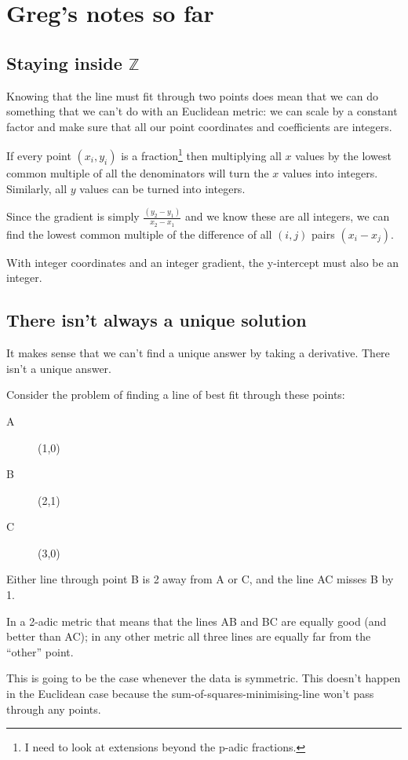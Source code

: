 \documentclass[a4paper,twocolumn, 10pt]{article}
\begin{document}
\section{Greg's notes so far}

\subsection{Staying inside $\mathbb{Z}$}

Knowing that the line must fit through two points does mean that we can do
something that we can't do with an Euclidean metric: we can scale by a constant
factor and make sure that all our point coordinates and coefficients are integers.

If every point $(x_i, y_i)$ is a fraction\footnote{I need to look at extensions beyond
  the p-adic fractions.} then multiplying all $x$ values by the lowest common multiple of all
the denominators will turn the $x$ values into integers. Similarly, all $y$ values can be turned
into integers.

Since the gradient is simply $\frac{(y_2 - y_1)}{x_2 - x_1}$ and we know these are all integers,
we can find the lowest
common multiple of the difference of all $(i,j)$ pairs $(x_i - x_j)$.

With integer coordinates and an integer gradient, the y-intercept must also be an integer.

\subsection{There isn't always a unique solution}

It makes sense that we can't find a unique answer by taking a derivative. There isn't a unique answer.

Consider the problem of finding a line of best fit through these points:

\begin{description}
\item[A] (1,0)
\item[B] (2,1)
\item[C] (3,0)
\end{description}

Either line through point B is 2 away from A or C, and the line AC misses B by 1.

In a 2-adic metric that means that the lines AB and BC are equally good (and better than AC); in any other
metric all three lines are equally far from the ``other'' point.

This is going to be the case whenever the data is symmetric. This doesn't happen in the Euclidean case
because the sum-of-squares-minimising-line won't pass through any points.


\end{document}
